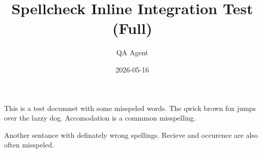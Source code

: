 \documentclass{article}
\title{Spellcheck Inline Integration Test (Full)}
\author{QA Agent}
\date{2026-05-16}
\begin{document}
\maketitle

This is a test documnet with some misspeled words.
The qwick brown fox jumps over the lazzy dog.
Accomodation is a commmon misspelling.

Another sentance with definately wrong spellings.
Recieve and occurence are also often misspeled.
\end{document}
